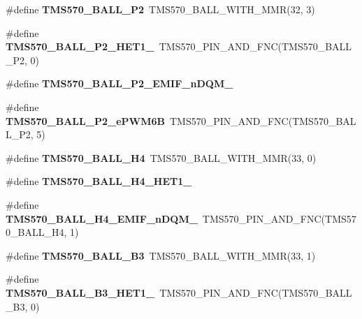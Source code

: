 \begin{DoxyCompactItemize}
\#define {\bfseries T\+M\+S570\+\_\+\+B\+A\+L\+L\+\_\+\+P2}~T\+M\+S570\+\_\+\+B\+A\+L\+L\+\_\+\+W\+I\+T\+H\+\_\+\+M\+MR(32, 3)
\item 
\mbox{\label{tms570lc4357-pins_8h_afe43874a305deaf26929c0c09cf36221}} 
\#define {\bfseries T\+M\+S570\+\_\+\+B\+A\+L\+L\+\_\+\+P2\+\_\+\+H\+E\+T1\+\_}~T\+M\+S570\+\_\+\+P\+I\+N\+\_\+\+A\+N\+D\+\_\+\+F\+NC(T\+M\+S570\+\_\+\+B\+A\+L\+L\+\_\+\+P2, 0)
\item 
\#define {\bfseries T\+M\+S570\+\_\+\+B\+A\+L\+L\+\_\+\+P2\+\_\+\+E\+M\+I\+F\+\_\+n\+D\+Q\+M\+\_}
\item 
\mbox{\label{tms570lc4357-pins_8h_a32ab1b758f1a1b11539750f653db35dc}} 
\#define {\bfseries T\+M\+S570\+\_\+\+B\+A\+L\+L\+\_\+\+P2\+\_\+e\+P\+W\+M6B}~T\+M\+S570\+\_\+\+P\+I\+N\+\_\+\+A\+N\+D\+\_\+\+F\+NC(T\+M\+S570\+\_\+\+B\+A\+L\+L\+\_\+\+P2, 5)
\item 
\mbox{\label{tms570lc4357-pins_8h_a2e14c53c19eb2dc53718652e80281a04}} 
\#define {\bfseries T\+M\+S570\+\_\+\+B\+A\+L\+L\+\_\+\+H4}~T\+M\+S570\+\_\+\+B\+A\+L\+L\+\_\+\+W\+I\+T\+H\+\_\+\+M\+MR(33, 0)
\item 
\#define {\bfseries T\+M\+S570\+\_\+\+B\+A\+L\+L\+\_\+\+H4\+\_\+\+H\+E\+T1\+\_}
\item 
\mbox{\label{tms570lc4357-pins_8h_afd850fe9527036912ca19345156dd2e1}} 
\#define {\bfseries T\+M\+S570\+\_\+\+B\+A\+L\+L\+\_\+\+H4\+\_\+\+E\+M\+I\+F\+\_\+n\+D\+Q\+M\+\_}~T\+M\+S570\+\_\+\+P\+I\+N\+\_\+\+A\+N\+D\+\_\+\+F\+NC(T\+M\+S570\+\_\+\+B\+A\+L\+L\+\_\+\+H4, 1)
\item 
\mbox{\label{tms570lc4357-pins_8h_a30f604e9a78b194cb6b69503a2330b1c}} 
\#define {\bfseries T\+M\+S570\+\_\+\+B\+A\+L\+L\+\_\+\+B3}~T\+M\+S570\+\_\+\+B\+A\+L\+L\+\_\+\+W\+I\+T\+H\+\_\+\+M\+MR(33, 1)
\item 
\mbox{\label{tms570lc4357-pins_8h_a5f3ff8b36ea1a283dacb73dea0569b08}} 
\#define {\bfseries T\+M\+S570\+\_\+\+B\+A\+L\+L\+\_\+\+B3\+\_\+\+H\+E\+T1\+\_}~T\+M\+S570\+\_\+\+P\+I\+N\+\_\+\+A\+N\+D\+\_\+\+F\+NC(T\+M\+S570\+\_\+\+B\+A\+L\+L\+\_\+\+B3, 0)
\item 
\mbox{\label{tms570lc4357-pins_8h_ae6bbfc57ddd047cb358449872bbeb14e}} 

\end{DoxyCompactItemize}
